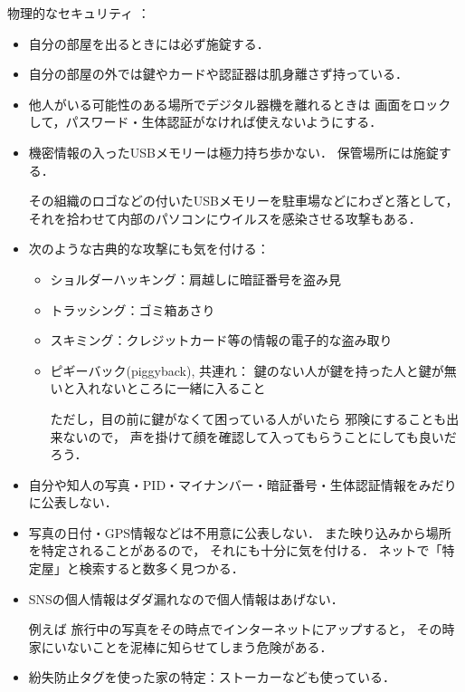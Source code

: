 物理的なセキュリティ ：
\begin{itemize}
   \item 
      自分の部屋を出るときには必ず施錠する．

   \item      
      自分の部屋の外では鍵やカードや認証器は肌身離さず持っている．
         
   \item 
      他人がいる可能性のある場所でデジタル器機を離れるときは
      画面をロックして，パスワード・生体認証がなければ使えないようにする．

   \item 
      機密情報の入ったUSBメモリーは極力持ち歩かない．
      保管場所には施錠する．
      
      その組織のロゴなどの付いたUSBメモリーを駐車場などにわざと落として，
      それを拾わせて内部のパソコンにウイルスを感染させる攻撃もある．

   \item 
      次のような古典的な攻撃にも気を付ける：
      \begin{itemize}
         \item ショルダーハッキング：肩越しに暗証番号を盗み見
         \item トラッシング：ゴミ箱あさり
         \item スキミング：クレジットカード等の情報の電子的な盗み取り
         \item
            ピギーバック(piggyback), 共連れ：
               鍵のない人が鍵を持った人と鍵が無いと入れないところに一緒に入ること
            
            ただし，目の前に鍵がなくて困っている人がいたら
            邪険にすることも出来ないので，
            声を掛けて顔を確認して入ってもらうことにしても良いだろう．
	\end{itemize}
  
   \item      
      自分や知人の写真・PID・マイナンバー・暗証番号・生体認証情報をみだりに公表しない．
      
   \item 
      写真の日付・GPS情報などは不用意に公表しない．
      また映り込みから場所を特定されることがあるので，
      それにも十分に気を付ける．
      ネットで「特定屋」と検索すると数多く見つかる．
   \item
      SNSの個人情報はダダ漏れなので個人情報はあげない．
      
      \noindent
      例えば
      旅行中の写真をその時点でインターネットにアップすると，
      その時家にいないことを泥棒に知らせてしまう危険がある．
   \item 
      紛失防止タグを使った家の特定：ストーカーなども使っている．


\end{itemize}
